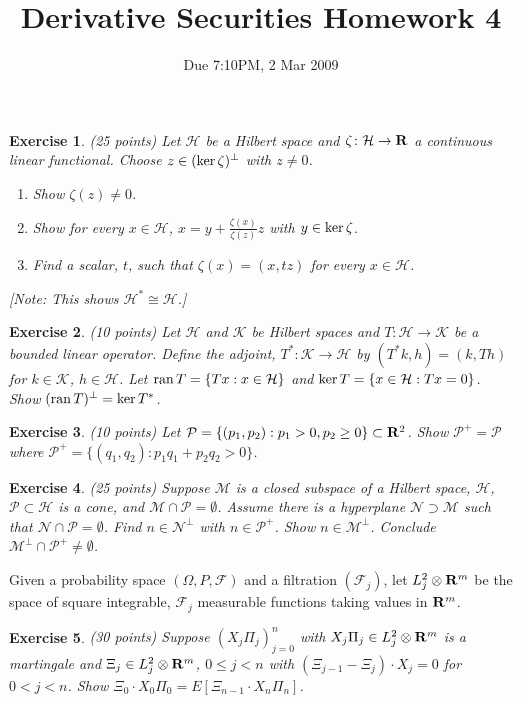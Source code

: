 \documentclass[11pt,fleqn]{amsproc}
\newcommand{\R}{{\bf R}}
\newcommand{\F}{\mathcal{F}}
\renewcommand{\H}{\mathcal{H}}
\newcommand{\K}{\mathcal{K}}
\newcommand{\M}{\mathcal{M}}
\newcommand{\N}{\mathcal{N}}
\renewcommand{\P}{\mathcal{P}}
\newcommand{\X}{\mathcal{X}}
\renewcommand{\ker}{\mathop{\rm{ker}}}
\newcommand{\ran}{\mathop{\rm{ran}}}
\newtheorem{xca}{Exercise}
\begin{document}
\title{Derivative Securities Homework 4}
\author{Due 7:10PM, 2 Mar 2009}

\maketitle

\begin{xca}{(25 points)}
Let $\H$ be a Hilbert space and $\zeta\colon\H\to\R$ a continuous linear functional.
Choose $z\in(\ker\zeta)^\perp$ with $z\not=0$.
\begin{enumerate}
\item Show $\zeta(z)\not=0$.
\item Show for every $x\in\H$, $x = y + \frac{\zeta(x)}{\zeta(z)}z$ with $y\in\ker\zeta$.
\item Find a scalar, $t$, such that $\zeta(x) = (x,tz)$ for every $x\in\H$.
\end{enumerate}
[Note: This shows $\H^*\cong\H$.]
\end{xca}

\begin{xca}{(10 points)}
Let $\H$ and $\K$ be Hilbert spaces and $T\colon\H\to\K$ be a bounded linear operator.
Define the adjoint, $T^*\colon\K\to\H$ by $(T^*k,h) = (k,Th)$ for $k\in\K$, $h\in\H$.
Let $\ran T = \{Tx:x\in\H\}$ and $\ker T = \{x\in\H : Tx = 0\}$.
Show $(\ran T)^\perp = \ker T^*$.
\end{xca}

\begin{xca}{(10 points)}
Let $\P = \{(p_1,p_2): p_1 > 0, p_2 \ge0\}\subset\R^2$. Show
$\P^+ = \P$ where $\P^+ = \{(q_1,q_2):p_1q_1 + p_2q_2 > 0\}$.
\end{xca}

\begin{xca}{(25 points)}
Suppose $\M$ is a closed subspace of a Hilbert space, $\H$, $\P\subset\H$ is a cone,
and $\M\cap\P=\emptyset$. Assume there is a hyperplane $\N\supset\M$
such that $\N\cap\P=\emptyset$. Find $n\in\N^\perp$ with $n\in\P^+$. Show $n\in\M^\perp$.
Conclude $\M^\perp\cap\P^+\not=\emptyset$.
\end{xca}

Given a probability space $(\Omega, P, \F)$ and a filtration $(\F_j)$, 
let $L^2_j\otimes\R^m$ be the space of square integrable, $\F_j$ measurable
functions taking values in $\R^m$.

\begin{xca}{(30 points)}
Suppose $(X_j\Pi_j)_{j=0}^n$ with $X_j\Pi_j\in L^2_j\otimes\R^m$ is a martingale and
$\Xi_j\in L^2_j\otimes\R^m$, $0\le j < n$ with $(\Xi_{j - 1} - \Xi_j)\cdot X_j = 0$
for $0 < j < n$. Show $\Xi_0\cdot X_0\Pi_0 = E[\Xi_{n-1}\cdot X_n\Pi_n]$.
\end{xca}
\end{document}
